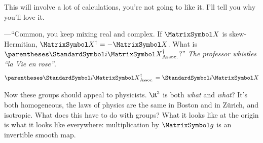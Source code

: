 \documentclass[10pt, a4paper, twoside]{lecturenotes}
\begin{document}
\begin{lecture}[date=2013-04-30, official=true]
This will involve a lot of calculations, you're not going to like it. I'll tell you why you'll love it.

---``Common, you keep mixing real and complex. If $\matX$ is skew-Hermitian, $\adj\matX=-\matX$. What is $\adj{\pa{\I\matX}}$?'' \emph{The professor whistles ``la Vie en rose''}.\[\adj{\pa{\I\matX}}=\I\matX\]

Now these groups should appeal to physicists. $\R^3$ is both \emph{what} and \emph{what}? It's both homogeneous, the laws of physics are the same in Boston and in Zürich, and isotropic. What does this have to do with groups? What it looks like at the origin is what it looks like everywhere: multiplication by $\matg$ is an invertible smooth map.


\end{lecture}
\end{document}
